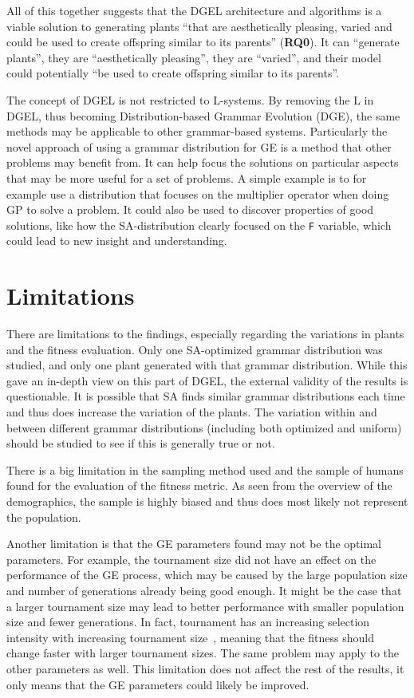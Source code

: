 All of this together suggests that the \gls{DGEL} architecture and algorithms is a viable solution to generating plants ``that are aesthetically pleasing, varied and could be used to create offspring similar to its parents'' (\textbf{RQ0}).
It can ``generate plants'', they are ``aesthetically pleasing'', they are ``varied'', and their model could potentially ``be used to create offspring similar to its parents''.

The concept of \gls{DGEL} is not restricted to \glspl{L-system}.
By removing the L in \gls{DGEL}, thus becoming Distribution-based Grammar Evolution (DGE), the same methods may be applicable to other grammar-based systems.
Particularly the novel approach of using a grammar distribution for \gls{GE} is a method that other problems may benefit from.
It can help focus the solutions on particular aspects that may be more useful for a set of problems.
A simple example is to for example use a distribution that focuses on the multiplier operator when doing \gls{GP} to solve a problem.
It could also be used to discover properties of good solutions, like how the \gls{SA}-distribution clearly focused on the \texttt{F} variable, which could lead to new insight and understanding.

\section{Limitations}
There are limitations to the findings, especially regarding the variations in plants and the fitness evaluation.
Only one \gls{SA}-optimized grammar distribution was studied, and only one plant generated with that grammar distribution.
While this gave an in-depth view on this part of \gls{DGEL}, the external validity of the results is questionable.
It is possible that \gls{SA} finds similar grammar distributions each time and thus does increase the variation of the plants.
The variation within and between different grammar distributions (including both optimized and uniform) should be studied to see if this is generally true or not.

There is a big limitation in the sampling method used and the sample of humans found for the evaluation of the fitness metric.
As seen from the overview of the demographics, the sample is highly biased and thus does most likely not represent the population.

Another limitation is that the \gls{GE} parameters found may not be the optimal parameters.
For example, the tournament size did not have an effect on the performance of the \gls{GE} process, which may be caused by the large population size and number of generations already being good enough.
It might be the case that a larger tournament size may lead to better performance with smaller population size and fewer generations.
In fact, tournament has an increasing selection intensity with increasing tournament size~\cite{1995Blickle}, meaning that the fitness should change faster with larger tournament sizes.
The same problem may apply to the other parameters as well.
This limitation does not affect the rest of the results, it only means that the \gls{GE} parameters could likely be improved.

